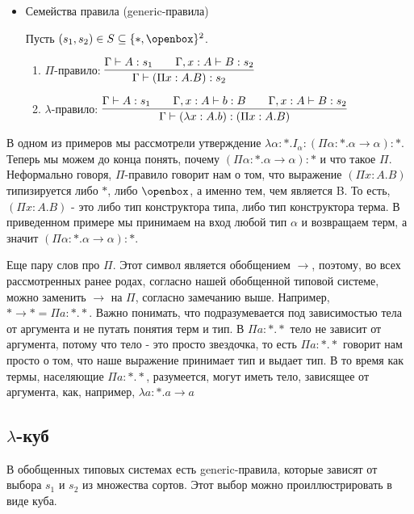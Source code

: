 \begin{itemize}
\item Семейства правила (generic-правила)

Пусть $(s_1, s_2) \in S \subseteq \{*, \openbox\}^2$.

\begin{enumerate}
    \item $\Pi$-правило: $\vcenter{\infer[]{\Gamma \vdash (\Pi x : A.B) : s_2}{\Gamma \vdash A : s_1 \qquad \Gamma, x : A \vdash B : s_2}}$
    \item $\lambda$-правило: $\vcenter{\infer[]{\Gamma \vdash (\lambda x : A . b) : (\Pi x : A. B)}{\Gamma \vdash A:s_1 \qquad \Gamma, x : A \vdash b : B \qquad \Gamma, x : A \vdash B : s_2}}$
\end{enumerate}

\end{itemize}

В одном из примеров мы рассмотрели утверждение $\lambda \alpha : *.I_\alpha : (\Pi \alpha : * . \alpha \rightarrow \alpha):*$. Теперь мы можем до конца понять, почему $(\Pi \alpha : * . \alpha \rightarrow \alpha):*$ и что такое $\Pi$. Неформально говоря, $\Pi$-правило говорит нам о том, что выражение $(\Pi x : A.B)$ типизируется либо $*$, либо $\openbox$, а именно тем, чем является B. То есть, $(\Pi x : A.B)$ - это либо тип конструктора типа, либо тип конструктора терма. В приведенном примере мы принимаем на вход любой тип $\alpha$  и возвращаем терм, а значит $(\Pi \alpha : * . \alpha \rightarrow \alpha):*$.

Еще пару слов про $\Pi$. Этот символ является обобщением $\rightarrow$, поэтому, во всех рассмотренных ранее родах, согласно нашей обобщенной типовой системе, можно заменить $\rightarrow$ на $\Pi$, согласно замечанию выше. Например, $* \rightarrow * = \Pi a : *. *$. Важно понимать, что подразумевается под зависимостью тела от аргумента и не путать понятия терм и тип. В $\Pi a : *. *$ тело не зависит от аргумента, потому что тело - это просто звездочка, то есть  $\Pi a : *. *$ говорит нам просто о том, что наше выражение принимает тип и выдает тип. В то время как термы, населяющие $\Pi a : *. *$, разумеется, могут иметь тело, зависящее от аргумента, как, например, $\lambda a : *. a \rightarrow a$

\subsection{$\lambda$-куб}

В обобщенных типовых системах есть generic-правила, которые зависят от выбора $s_1$ и $s_2$ из множества сортов. Этот выбор можно проиллюстрировать в виде куба.

